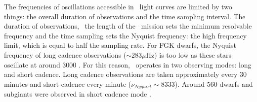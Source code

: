 
The frequencies of oscillations accessible in \kepler\ light curves are
limited by two things: the overall duration of observations and the time
sampling interval.
The duration of observations, \ie\ the length of the \kepler\ mission sets the
minimum resolvable frequency and the time sampling sets the Nyquist frequency:
the high frequency limit, which is equal to half the sampling rate.
For FGK dwarfs, the Nyquist frequency of long cadence observations ($\sim 283
\mu$Hz) is too low as these stars oscillate at around 3000 \uHz.
For this reason, \kepler\ operates in two observing modes: long and short
cadence.
Long cadence observations are taken approximately every 30 minutes and short
cadence every minute ($\nu_{Nyquist} \sim 8333$\uHz).
Around 560 dwarfs and subgiants were observed in short cadence mode
\citep{Chaplin2014}.

